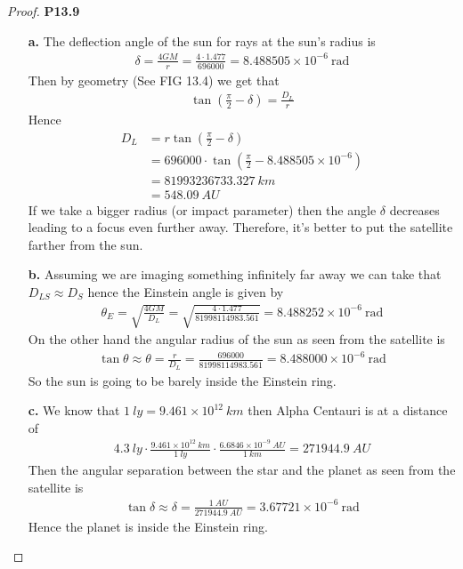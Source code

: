 \documentclass[11pt]{article}
\theoremstyle{definition}
\begin{document}
\cleardoublepage
\begin{proof}{\textbf{P13.9}}
\begin{itemize}
\item [\textbf{a.}] The deflection angle of the sun for rays at the sun's radius
is
\begin{align*}
    \delta = \frac{4GM}{r} = \frac{4 \cdot 1.477}{696000}
    = 8.488505 \times 10^{-6}~\text{rad}
\end{align*}
Then by geometry (See FIG 13.4) we get that
\begin{align*}
    \tan(\frac{\pi}{2} - \delta) = \frac{D_L}{r}
\end{align*}
Hence
\begin{align*}
    D_L &= r\tan(\frac{\pi}{2} - \delta)\\
    &= 696000 \cdot \tan(\frac{\pi}{2} - 8.488505 \times 10^{-6})\\
    &= 81993236733.327~km\\
    &= 548.09~AU
\end{align*}
If we take a bigger radius (or impact parameter) then the angle $\delta$
decreases leading to a focus even further away. Therefore, it's better to put
the satellite farther from the sun.

\item [\textbf{b.}] Assuming we are imaging something infinitely far away 
we can take that $D_{LS} \approx D_S$ hence the Einstein angle is given by
\begin{align*}
    \theta_E = \sqrt{\frac{4GM}{D_L}} = \sqrt{\frac{4\cdot1.477}{81998114983.561}}
    = 8.488252 \times 10^{-6}~\text{rad}
\end{align*}
On the other hand the angular radius of the sun as seen from the satellite is
\begin{align*}
    \tan\theta \approx \theta = \frac{r}{D_L} = \frac{696000}{81998114983.561}
    = 8.488000 \times 10^{-6}~\text{rad}
\end{align*}
So the sun is going to be barely inside the Einstein ring.

\item [\textbf{c.}] We know that $1~ly = 9.461\times 10^{12}~km$ then Alpha
Centauri is at a distance of
\begin{align*}
    4.3~ly \cdot \frac{9.461\times 10^{12}~km}{1~ly}
    \cdot \frac{6.6846 \times 10^{-9}~AU}{1~km}
    = 271944.9~AU
\end{align*}
Then the angular separation between the star and the planet as seen from the
satellite is
\begin{align*}
    \tan\delta \approx \delta = \frac{1~AU}{271944.9~AU} = 3.67721\times 10^{-6}~\text{rad}
\end{align*}
Hence the planet is inside the Einstein ring.


\end{itemize}
\end{proof}
\end{document}
